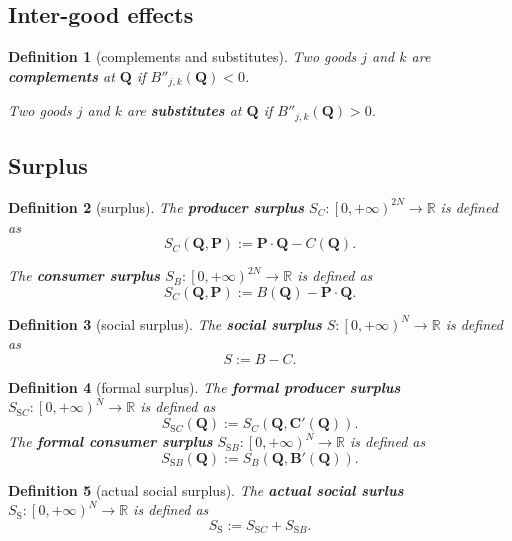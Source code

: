 \documentclass{article}
\newtheorem{definition}{Definition}[subsection]
\begin{document}
\subsection{Inter-good effects}

\begin{definition}[complements and substitutes]
Two goods $j$ and $k$ are \textbf{complements} at $\mathbf Q$ if $B''_{j,k}\!\left(\mathbf Q\right)<0$.

Two goods $j$ and $k$ are \textbf{substitutes} at $\mathbf Q$ if $B''_{j,k}\!\left(\mathbf Q\right)>0$.
\end{definition}

\subsection{Surplus}

\begin{definition}[surplus]
\label{multi surplus}
The \textbf{producer surplus} $S_C:\left[0,+\infty\right)^{2N}\to\mathbb R$ is defined as
$$S_C\!\left(\mathbf Q,\mathbf P\right):=\mathbf P\cdot\mathbf Q-C\!\left(\mathbf Q\right).$$

The \textbf{consumer surplus} $S_B:\left[0,+\infty\right)^{2N}\to\mathbb R$ is defined as
$$S_C\!\left(\mathbf Q,\mathbf P\right):=B\!\left(\mathbf Q\right)-\mathbf P\cdot\mathbf Q.$$
\end{definition}

\begin{definition}[social surplus]
\label{multi social surplus}
The \textbf{social surplus} $S:\left[0,+\infty\right)^N\to\mathbb R$ is defined as
$$S:=B-C.$$
\end{definition}

\begin{definition}[formal surplus]
\label{multi formal surplus}
The \textbf{formal producer surplus} $S_{\mathrm SC}:\left[0,+\infty\right)^N\to\mathbb R$ is defined as
$$S_{\mathrm SC}\!\left(\mathbf Q\right):=S_C\!\left(\mathbf Q,\mathbf C'\!\left(\mathbf Q\right)\right).$$
The \textbf{formal consumer surplus} $S_{\mathrm SB}:\left[0,+\infty\right)^N\to\mathbb R$ is defined as
$$S_{\mathrm SB}\!\left(\mathbf Q\right):=S_B\!\left(\mathbf Q,\mathbf B'\!\left(\mathbf Q\right)\right).$$
\end{definition}

\begin{definition}[actual social surplus]
\label{multi actual social surplus}
The \textbf{actual social surlus} $S_\mathrm S:\left[0,+\infty\right)^N\to\mathbb R$ is defined as
$$S_\mathrm S:=S_{\mathrm SC}+S_{\mathrm SB}.$$
\end{definition}
\end{document}

